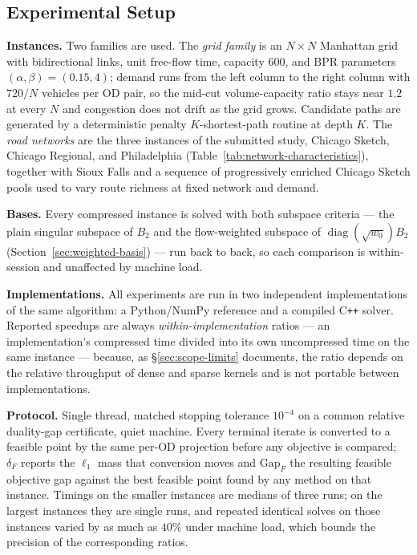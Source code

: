 \documentclass[11pt]{article}
\begin{document}
\subsection{Experimental Setup}
\label{sec:setup}


\textbf{Instances.} Two families are used. The \emph{grid family} is an $N\times N$
Manhattan grid with bidirectional links, unit free-flow time, capacity $600$, and BPR
parameters $(\alpha,\beta)=(0.15,4)$; demand runs from the left column to the right column
with $720/N$ vehicles per OD pair, so the mid-cut volume-capacity ratio stays near $1.2$ at
every $N$ and congestion does not drift as the grid grows. Candidate paths are generated by
a deterministic penalty $K$-shortest-path routine at depth $K$. The \emph{road networks} are
the three instances of the submitted study, Chicago Sketch, Chicago Regional, and
Philadelphia (Table~\ref{tab:network-characteristics}), together with Sioux Falls and a
sequence of progressively enriched Chicago Sketch pools used to vary route richness at fixed
network and demand.

\textbf{Bases.} Every compressed instance is solved with both subspace criteria --- the plain
singular subspace of $B_2$ and the flow-weighted subspace of
$\operatorname{diag}(\sqrt{w_0})B_2$ (Section~\ref{sec:weighted-basis}) --- run back to back, so
each comparison is within-session and unaffected by machine load.

\textbf{Implementations.} All experiments are run in two independent implementations of the
same algorithm: a Python/NumPy reference and a compiled C\texttt{++} solver. Reported
speedups are always \emph{within-implementation} ratios --- an implementation's compressed
time divided into its own uncompressed time on the same instance --- because, as
\S\ref{sec:scope-limits} documents, the ratio depends on the relative throughput of dense and
sparse kernels and is not portable between implementations.

\textbf{Protocol.} Single thread, matched stopping tolerance $10^{-4}$ on a common relative
duality-gap certificate, quiet machine. Every terminal iterate is converted to a feasible
point by the same per-OD projection before any objective is compared; $\delta_F$ reports the
$\ell_1$ mass that conversion moves and $\mathrm{Gap}_F$ the resulting feasible objective
gap against the best feasible point found by any method on that instance. Timings on the
smaller instances are medians of three runs; on the largest instances they are single runs,
and repeated identical solves on those instances varied by as much as $40\%$ under machine
load, which bounds the precision of the corresponding ratios.
\end{document}
